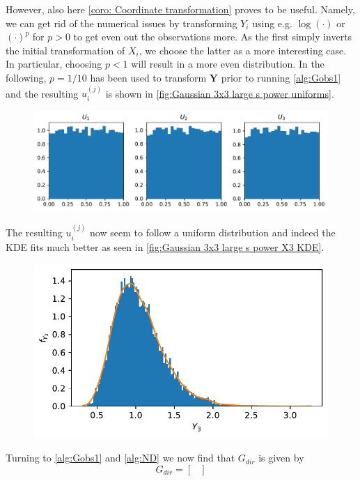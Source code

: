 \documentclass[../Thesis.tex]{subfiles}
\begin{document}
\begin{example}
    However, also here \autoref{coro: Coordinate transformation} proves to be useful. Namely, we can get rid of the numerical issues by transforming $Y_i$ using e.g. $\log(\cdot)$ or $(\cdot)^{p}$ for $p>0$ to get even out the observations more. As the first simply inverts the initial transformation of $X_i$, we choose the latter as a more interesting case. In particular, choosing $p<1$ will result in a more even distribution. In the following, $p=1/10$ has been used to transform $\boldsymbol Y$ prior to running \autoref{alg:Gobs1} and the resulting $u_i^{(j)}$ is shown in \autoref{fig:Gaussian 3x3 large s power uniforms}.
    \begin{figure}[H]
        \centering
        \includegraphics[width=0.99\linewidth]{figures/ND examples/Gaussian 3x3 large s power uniforms.pdf}
        \caption{}
        \label{fig:Gaussian 3x3 large s power uniforms}
    \end{figure}
    The resulting $u_i^{(j)}$ now seem to follow a uniform distribution and indeed the KDE fits much better as seen in \autoref{fig:Gaussian 3x3 large s power X3 KDE}.
    \begin{figure}[H]
        \centering
        \includegraphics[width=0.7\linewidth]{figures/ND examples/Gaussian 3x3 large s power X3 KDE.pdf}
        \caption{}
        \label{fig:Gaussian 3x3 large s power X3 KDE}
    \end{figure}
    Turning to \autoref{alg:Gobs1} and \autoref{alg:ND} we now find that $G_{dir}$ is given by
    $$G_{dir} =
        \begin{bmatrix}

\end{bmatrix}$$
\end{example}
\end{document}
